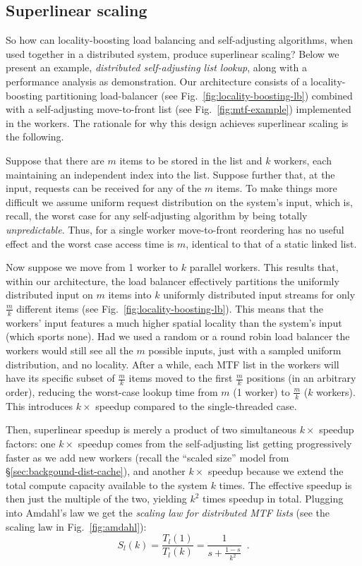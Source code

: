 \subsection{Superlinear scaling}
\label{sec:arch-scaling}

So how can locality-boosting load balancing and self-adjusting algorithms, when used together in a distributed system, produce superlinear scaling? Below we present an example, \emph{distributed self-adjusting list lookup}, along with a performance analysis as demonstration. Our architecture consists of a locality-boosting partitioning load-balancer (see Fig.~\ref{fig:locality-boosting-lb}) combined with a self-adjusting move-to-front list (see Fig.~\ref{fig:mtf-example}) implemented in the workers. The rationale for why this design achieves superlinear scaling is the following.

Suppose that there are $m$ items to be stored in the list and $k$ workers, each maintaining an independent index into the list. Suppose further that, at the input, requests can be received for any of the $m$ items. To make things more difficult we assume uniform request distribution on the system's input, which is, recall, the worst case for any self-adjusting algorithm by being totally \emph{unpredictable}. Thus, for a single worker move-to-front reordering has no useful effect and the worst case access time is $m$, identical to that of a static linked list.

Now suppose we move from 1 worker to $k$ parallel workers. This results that, within our architecture, the load balancer effectively partitions the uniformly distributed input on $m$ items into $k$ uniformly distributed input streams for only $\frac{m}{k}$ different items (see Fig.~\ref{fig:locality-boosting-lb}). This means that the workers' input features a much higher spatial locality than the system's input (which sports none).  Had we used a random or a round robin load balancer the workers would still see all the $m$ possible inputs, just with a sampled uniform distribution, and no locality. After a while, each MTF list in the workers will have its specific subset of $\frac{m}{k}$ items moved to the first $\frac{m}{k}$ positions (in an arbitrary order), reducing the worst-case lookup time from $m$ (1 worker) to $\frac{m}{k}$ ($k$ workers). This introduces $k\times$ speedup compared to the single-threaded case.

Then, superlinear speedup is merely a product of two simultaneous $k\times$ speedup factors: one $k\times$ speedup comes from the self-adjusting list getting progressively faster as we add new workers (recall the ``scaled size'' model from \S\ref{sec:backgound-dist-cache}), and another $k\times$ speedup because we extend the total compute capacity available to the system $k$ times. The effective speedup is then just the multiple of the two, yielding $k^2$ times speedup in total. Plugging into Amdahl's law we get the \emph{scaling law for distributed MTF lists} (see the scaling law in Fig.~\ref{fig:amdahl}):
\begin{equation}\label{eq:mtf-perf}
  S_l(k) = \frac{T_l(1)}{T_l(k)} = \frac1{s + \frac{1-s}{k^2}} \enspace .
\end{equation}

